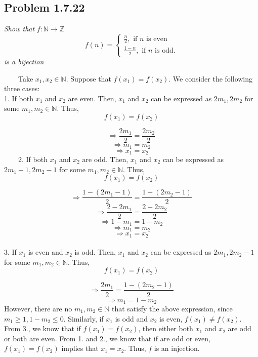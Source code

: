 \documentclass[
]{article}
\begin{document}
\hypertarget{problem-1.7.22}{%
\subsection{Problem 1.7.22}\label{problem-1.7.22}}

\emph{Show that} \(f:\mathbb{N} \rightarrow \mathbb{Z}\)
\[f(n) = \begin{cases} \frac{n}{2}, \text{       if }n \text{ is even} \\ \frac{1 -n}{2}, \text{       if }n \text{ is odd.} \end{cases}\]
\emph{is a bijection}

~~~~Take \(x_1, x_2 \in \mathbb{N}\). Suppose that \(f(x_1) = f(x_2)\).
We consider the following three cases:\\
\hspace*{0.333em}\hspace*{0.333em}\hspace*{0.333em}\hspace*{0.333em}1.
If both \(x_1\) and \(x_2\) are even. Then, \(x_1\) and \(x_2\) can be
expressed as \(2m_1, 2m_2\) for some \(m_1, m_2 \in \mathbb{N}\). Thus,
\[f(x_1) = f(x_2)\]

\[\Longrightarrow \frac{2m_1}{2} = \frac{2m_2}{2}\]
\[\Longrightarrow m_1 = m_2\] \[\Longrightarrow x_1 = x_2\] ~~~~2. If
both \(x_1\) and \(x_2\) are odd. Then, \(x_1\) and \(x_2\) can be
expressed as \(2m_1 - 1, 2m_2 - 1\) for some
\(m_1, m_2 \in \mathbb{N}\). Thus, \[f(x_1) = f(x_2)\]

\[\Longrightarrow \frac{1 - (2m_1 -1)}{2} = \frac{1-(2m_2-1)}{2}\]
\[\Longrightarrow \frac{2 - 2m_1}{2} = \frac{2-2m_2}{2}\]
\[\Longrightarrow 1 - m_1 = 1-m_2\] \[\Longrightarrow m_1 = m_2\]
\[\Longrightarrow x_1 = x_2\]\\
\hspace*{0.333em}\hspace*{0.333em}\hspace*{0.333em}\hspace*{0.333em}3.
If \(x_1\) is even and \(x_2\) is odd. Then, \(x_1\) and \(x_2\) can be
expressed as \(2m_1, 2m_2 - 1\) for some \(m_1, m_2 \in \mathbb{N}\).
Thus, \[f(x_1) = f(x_2)\]

\[\Longrightarrow \frac{2m_1 }{2} = \frac{1-(2m_2-1)}{2}\]
\[\Longrightarrow m_1 = 1 -m_2\] However, there are no
\(m_1, m_2 \in \mathbb{N}\) that satisfy the above expression, since
\(m_1 \geq 1, 1-m_2 \leq 0\). Similarly, if \(x_1\) is odd and \(x_2\)
is even, \(f(x_1) \neq f(x_2)\).\\
\hspace*{0.333em}\hspace*{0.333em}\hspace*{0.333em}\hspace*{0.333em}From
3., we know that if \(f(x_1) = f(x_2)\), then either both \(x_1\) and
\(x_2\) are odd or both are even. From 1. and 2., we know that if are
odd or even, \(f(x_1) = f(x_2)\) implies that \(x_1 = x_2\). Thus, \(f\)
is an injection.
\end{document}
